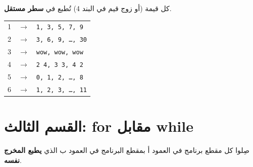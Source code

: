 \documentclass[14pt]{extarticle}
\begin{document}
\ifwithsols
\begin{boxSolution}
كل قيمة (أو زوج قيم في البند 4) تُطبع في \textbf{سطر مستقل}.

\begin{english}
\renewcommand{\arraystretch}{1.2}
\begin{tabular}{rcl}
1 & $\rightarrow$ & \texttt{1, 3, 5, 7, 9} \\
2 & $\rightarrow$ & \texttt{3, 6, 9, \ldots, 30} \\
3 & $\rightarrow$ & \texttt{wow, wow, wow} \\
4 & $\rightarrow$ & \texttt{2 4, 3 3, 4 2} \\
5 & $\rightarrow$ & \texttt{0, 1, 2, \ldots, 8} \\
6 & $\rightarrow$ & \texttt{1, 2, 3, \ldots, 11} \\
\end{tabular}
\end{english}
\end{boxSolution}
\fi

\clearpage
\section*{القسم الثالث: \textenglish{for} مقابل \textenglish{while}}

صِلوا كل مقطع برنامج في العمود أ بمقطع البرنامج في العمود ب الذي \textbf{يطبع المخرج نفسه}.
\end{document}
